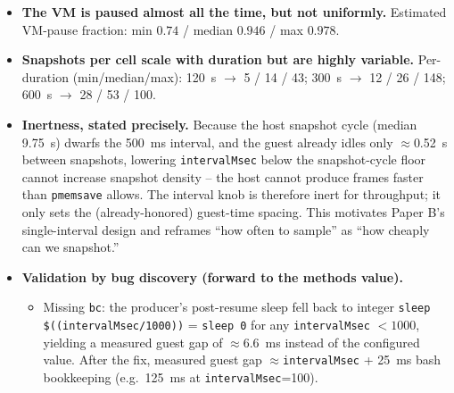 \documentclass[conference]{IEEEtran}
\begin{document}
\begin{itemize}
  \item \textbf{The VM is paused almost all the time, but not uniformly.}
        Estimated VM-pause fraction: min $0.74$ / median $0.946$ / max
        $0.978$.
  \item \textbf{Snapshots per cell scale with duration but are highly
        variable.} Per-duration (min/median/max):
        \SI{120}{\second} $\rightarrow$ 5 / 14 / 43;
        \SI{300}{\second} $\rightarrow$ 12 / 26 / 148;
        \SI{600}{\second} $\rightarrow$ 28 / 53 / 100.
  \item \textbf{Inertness, stated precisely.} Because the host snapshot cycle
        (median \SI{9.75}{\second}) dwarfs the \SI{500}{\milli\second}
        interval, and the guest already idles only $\approx$\SI{0.52}{\second}
        between snapshots, lowering \texttt{intervalMsec} below the
        snapshot-cycle floor cannot increase snapshot density -- the host
        cannot produce frames faster than \texttt{pmemsave} allows. The
        interval knob is therefore inert for throughput; it only sets the
        (already-honored) guest-time spacing. This motivates Paper B's
        single-interval design and reframes ``how often to sample'' as ``how
        cheaply can we snapshot.''
  \item \textbf{Validation by bug discovery (forward to the methods value).}
        \begin{itemize}
          \item Missing \texttt{bc}: the producer's post-resume sleep fell
                back to integer \texttt{sleep \$((intervalMsec/1000))} =
                \texttt{sleep 0} for any \texttt{intervalMsec} $< 1000$,
                yielding a measured guest gap of $\approx$\SI{6.6}{\milli\second}
                instead of the configured value. After the fix, measured
                guest gap $\approx$\texttt{intervalMsec} + \SI{25}{\milli\second}
                bash bookkeeping (e.g.\ \SI{125}{\milli\second} at
                \texttt{intervalMsec}=100).

\end{itemize}
\end{itemize}
\end{document}

